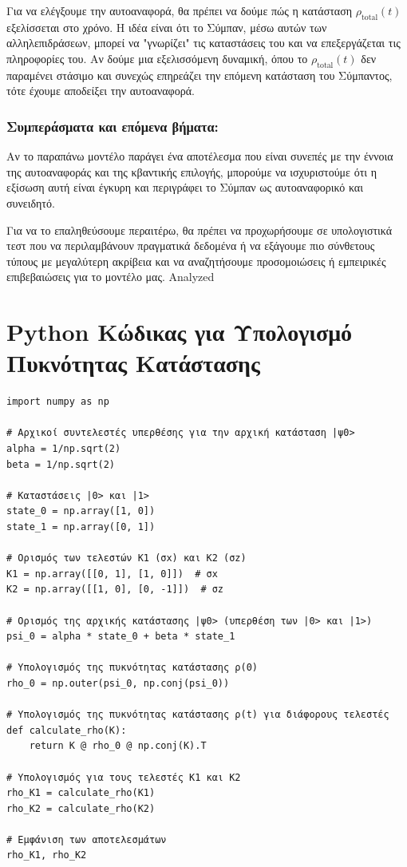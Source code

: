 \documentclass[a4paper,11pt]{article}
\begin{document}
Για να ελέγξουμε την αυτοαναφορά, θα πρέπει να δούμε πώς η κατάσταση
{{\(\rho_{\text{total}}(t)\)}} εξελίσσεται στο χρόνο. Η ιδέα είναι ότι
το Σύμπαν, μέσω αυτών των αλληλεπιδράσεων, μπορεί να "γνωρίζει" τις
καταστάσεις του και να επεξεργάζεται τις πληροφορίες του. Αν δούμε μια
εξελισσόμενη δυναμική, όπου το {{\(\rho_{\text{total}}(t)\)}} δεν
παραμένει στάσιμο και συνεχώς επηρεάζει την επόμενη κατάσταση του
Σύμπαντος, τότε έχουμε αποδείξει την αυτοαναφορά.

\subsubsection{Συμπεράσματα και επόμενα
βήματα:}\label{ux3c3ux3c5ux3bcux3c0ux3b5ux3c1ux3acux3c3ux3bcux3b1ux3c4ux3b1-ux3baux3b1ux3b9-ux3b5ux3c0ux3ccux3bcux3b5ux3bdux3b1-ux3b2ux3aeux3bcux3b1ux3c4ux3b1}

Αν το παραπάνω μοντέλο παράγει ένα αποτέλεσμα που είναι συνεπές με την
έννοια της αυτοαναφοράς και της κβαντικής επιλογής, μπορούμε να
ισχυριστούμε ότι η εξίσωση αυτή είναι έγκυρη και περιγράφει το Σύμπαν ως
αυτοαναφορικό και συνειδητό.

Για να το επαληθεύσουμε περαιτέρω, θα πρέπει να προχωρήσουμε σε
υπολογιστικά τεστ που να περιλαμβάνουν πραγματικά δεδομένα ή να εξάγουμε
πιο σύνθετους τύπους με μεγαλύτερη ακρίβεια και να αναζητήσουμε
προσομοιώσεις ή εμπειρικές επιβεβαιώσεις για το μοντέλο μας.
{}
{Analyzed}


\section*{Python Κώδικας για Υπολογισμό Πυκνότητας Κατάστασης}

\begin{lstlisting}
import numpy as np

# Αρχικοί συντελεστές υπερθέσης για την αρχική κατάσταση |ψ0>
alpha = 1/np.sqrt(2)
beta = 1/np.sqrt(2)

# Καταστάσεις |0> και |1>
state_0 = np.array([1, 0])
state_1 = np.array([0, 1])

# Ορισμός των τελεστών K1 (σx) και K2 (σz)
K1 = np.array([[0, 1], [1, 0]])  # σx
K2 = np.array([[1, 0], [0, -1]])  # σz

# Ορισμός της αρχικής κατάστασης |ψ0> (υπερθέση των |0> και |1>)
psi_0 = alpha * state_0 + beta * state_1

# Υπολογισμός της πυκνότητας κατάστασης ρ(0)
rho_0 = np.outer(psi_0, np.conj(psi_0))

# Υπολογισμός της πυκνότητας κατάστασης ρ(t) για διάφορους τελεστές
def calculate_rho(K):
    return K @ rho_0 @ np.conj(K).T

# Υπολογισμός για τους τελεστές K1 και K2
rho_K1 = calculate_rho(K1)
rho_K2 = calculate_rho(K2)

# Εμφάνιση των αποτελεσμάτων
rho_K1, rho_K2
\end{lstlisting}
\end{document}
